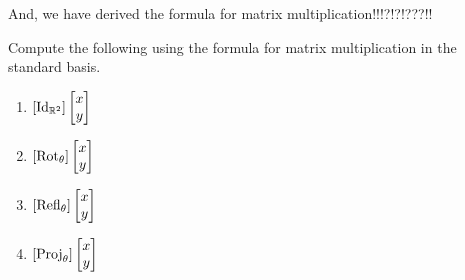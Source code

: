 And, we have derived the formula for matrix multiplication!!!?!?!???!!

\begin{qbox}
  Compute the following using the formula for matrix multiplication in the standard basis.
  \begin{multicols}{2}
    \begin{enumerate}
      \item $[\operatorname{Id}_{\mathbb{R}^2}]\begin{bmatrix} x \\ y \end{bmatrix}$
      \item $[\mathrm{Rot}_{\theta}] \begin{bmatrix} x \\ y \end{bmatrix}$
      \item $[\mathrm{Refl}_{\theta}] \begin{bmatrix} x \\ y \end{bmatrix}$
      \item $[\mathrm{Proj}_{\theta}] \begin{bmatrix} x \\ y \end{bmatrix}$
    \end{enumerate}
  \end{multicols}
\end{qbox}





